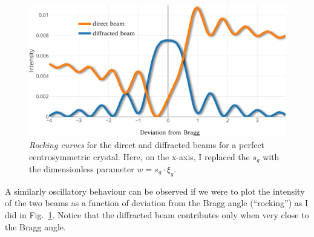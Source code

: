 \begin{figure}[ht]
    \centering
\includegraphics[width=0.84\linewidth]{Figures/rocking.png}
\caption[Rocking curves.]{\textit{Rocking curves} for the direct and diffracted beams for a perfect centrosymmetric crystal. Here, on the x-axis, I replaced the $s_g$ with the dimensionless parameter $w=s_g \cdot\xi_g$.}
\label{Fig:rocking}

\end{figure}

A similarly oscillatory behaviour can be observed if we were to plot the intensity of the two beams as a function of deviation from the Bragg angle (``rocking'') as I did in Fig.~\ref{Fig:rocking}. Notice that the diffracted beam contributes only when very close to the Bragg angle. 



